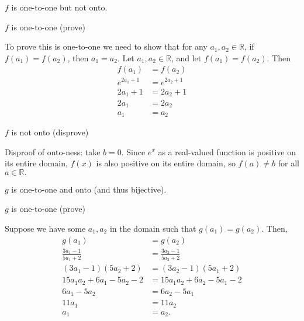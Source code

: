 \documentclass[12pt]{exam}
\begin{document}
\begin{solution}
\begin{qparts}
    \item $f$ is one-to-one but not onto.
    \begin{qsubparts}
        \item $f$ is one-to-one (prove)

        To prove this is one-to-one we need to show that for any $a_1, a_2 \in \mathbb{R}$, if $f(a_1) = f(a_2)$, then $a_1 = a_2$. Let $a_1, a_2 \in \mathbb{R}$, and let $f(a_1) = f(a_2)$. Then 
        \begin{align*}
            f(a_1) &= f(a_2) \tag{assumption} \\
            e^{2a_1 + 1} &= e^{2a_2 + 1} \tag{definition of $f$}\\
            2a_1 + 1 &= 2a_2 + 1 \tag{take the log of both sides}\\
            2a_1 &= 2a_2 \tag{subtract 1 from each side}\\
            a_1 &= a_2 \tag{divide both sides by 2}
        \end{align*}

        \item $f$ is not onto (disprove)

        Disproof of onto-ness: take $b = 0$. Since $e^x$ as a real-valued function is positive on its entire domain, $f(x)$ is also positive on its entire domain, so $f(a)\ne b$ for all $a\in\mathbb{R}.$
    \end{qsubparts}
    \item $g$ is one-to-one and onto (and thus bijective).
    \begin{qsubparts}
        \item $g$ is one-to-one (prove)

        Suppose we have some $a_1, a_2$ in the domain such that $g(a_1) = g(a_2)$. Then, 
        \begin{align*}
            g(a_1) &= g(a_2) \tag{assumption} \\
            \frac{3a_1 - 1}{5a_1 + 2} &= \frac{3a_2 - 1}{5a_2 + 2} \tag{definition of $g$}\\
            (3a_1 - 1)(5a_2 + 2) &= (3a_2 - 1)(5a_1 + 2) \tag{cross-multiply}\\
            15a_1 a_2 + 6a_1 - 5a_2 - 2 &= 15a_1 a_2 + 6a_2 - 5a_1 - 2 \tag{distribute}\\
            6a_1 - 5a_2 &= 6a_2 - 5a_1 \tag{subtract like terms}\\
            11a_1 &= 11a_2 \tag{combine like terms}\\
            a_1 &= a_2. \tag{divide both sides by 11}
        \end{align*}


\end{qsubparts}
\end{qparts}
\end{solution}
\end{document}
